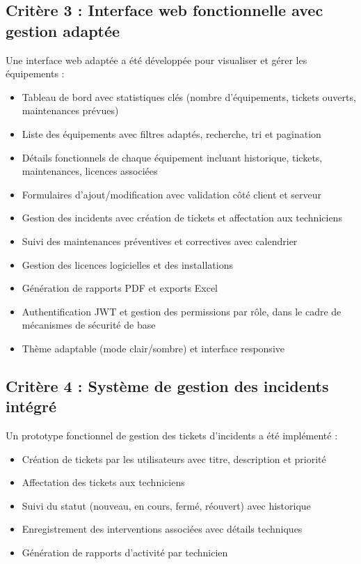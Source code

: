 \subsection*{Critère 3 : Interface web fonctionnelle avec gestion adaptée}

Une interface web adaptée a été développée pour visualiser et gérer les équipements :
\begin{itemize}
    \item Tableau de bord avec statistiques clés (nombre d'équipements, tickets ouverts, maintenances prévues)
    \item Liste des équipements avec filtres adaptés, recherche, tri et pagination
    \item Détails fonctionnels de chaque équipement incluant historique, tickets, maintenances, licences associées
    \item Formulaires d'ajout/modification avec validation côté client et serveur
    \item Gestion des incidents avec création de tickets et affectation aux techniciens
    \item Suivi des maintenances préventives et correctives avec calendrier
    \item Gestion des licences logicielles et des installations
    \item Génération de rapports PDF et exports Excel
    \item Authentification JWT et gestion des permissions par rôle, dans le cadre de mécanismes de sécurité de base
    \item Thème adaptable (mode clair/sombre) et interface responsive
\end{itemize}

\subsection*{Critère 4 : Système de gestion des incidents intégré}

Un prototype fonctionnel de gestion des tickets d'incidents a été implémenté :
\begin{itemize}
    \item Création de tickets par les utilisateurs avec titre, description et priorité
    \item Affectation des tickets aux techniciens
    \item Suivi du statut (nouveau, en cours, fermé, réouvert) avec historique
    \item Enregistrement des interventions associées avec détails techniques
    \item Génération de rapports d'activité par technicien
\end{itemize}


